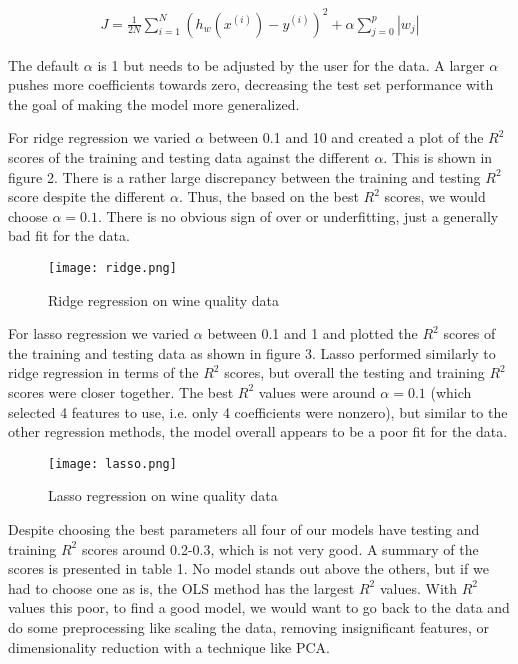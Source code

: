 \documentclass[12pt,letterpaper]{article}
\begin{document}
\begin{align}
	J=\frac{1}{2N}\sum_{i=1}^{N}(h_w(x^{(i)})-y^{(i)})^2+\alpha\sum_{j=0}^{p}|w_j|
\end{align}

The default $\alpha$ is 1 but needs to be adjusted by the user for the data. A larger $\alpha$ pushes more coefficients towards zero, decreasing the test set performance with the goal of making the model more generalized.

For ridge regression we varied $\alpha$ between 0.1 and 10 and created a plot of the $R^2$ scores of the training and testing data against the different $\alpha.$ This is shown in figure 2. There is a rather large discrepancy between the training and testing $R^2$ score despite the different $\alpha$. Thus, the based on the best $R^2$ scores, we would choose $ \alpha = 0.1 $. There is no obvious sign of over or underfitting, just a generally bad fit for the data.

\begin{figure}[h]
	\centering
	\texttt{[image: ridge.png]}
	\caption{Ridge regression on wine quality data}
\end{figure}

For lasso regression we varied $\alpha$ between 0.1 and 1 and plotted the $ R^2 $ scores of the training and testing data as shown in figure 3. Lasso performed similarly to ridge regression in terms of the $R^2$ scores, but overall the testing and training $R^2$ scores were closer together. The best $R^2$ values were around $\alpha=0.1$ (which selected 4 features to use, i.e. only 4 coefficients were nonzero), but similar to the other regression methods, the model overall appears to be a poor fit for the data.

\begin{figure}[h]
	\centering
	\texttt{[image: lasso.png]}
	\caption{Lasso regression on wine quality data}
\end{figure}

Despite choosing the best parameters all four of our models have testing and training $R^2$ scores around 0.2-0.3, which is not very good. A summary of the scores is presented in table 1. No model stands out above the others, but if we had to choose one as is, the OLS method has the largest $R^2$ values. With $R^2$ values this poor, to find a good model, we would want to go back to the data and do some preprocessing like scaling the data, removing insignificant features, or dimensionality reduction with a technique like PCA.
\end{document}
